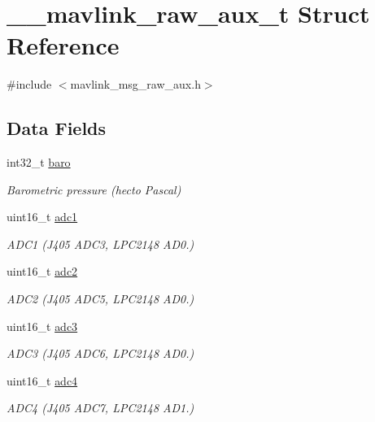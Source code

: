 \hypertarget{struct____mavlink__raw__aux__t}{\section{\+\_\+\+\_\+mavlink\+\_\+raw\+\_\+aux\+\_\+t Struct Reference}
\label{struct____mavlink__raw__aux__t}
}


{\ttfamily \#include $<$mavlink\+\_\+msg\+\_\+raw\+\_\+aux.\+h$>$}

\subsection*{Data Fields}
\begin{DoxyCompactItemize}
\item 
int32\+\_\+t \hyperlink{struct____mavlink__raw__aux__t_a5679ca5087f4ff5f9cc74757c1625328}{baro}
\begin{DoxyCompactList}\small\item\em Barometric pressure (hecto Pascal) \end{DoxyCompactList}\item 
uint16\+\_\+t \hyperlink{struct____mavlink__raw__aux__t_a3aef53e08ea480853c1bb5165c8ac52a}{adc1}
\begin{DoxyCompactList}\small\item\em A\+D\+C1 (J405 A\+D\+C3, L\+P\+C2148 A\+D0.) \end{DoxyCompactList}\item 
uint16\+\_\+t \hyperlink{struct____mavlink__raw__aux__t_a86a9158efd3095b7ce52e9f539c14624}{adc2}
\begin{DoxyCompactList}\small\item\em A\+D\+C2 (J405 A\+D\+C5, L\+P\+C2148 A\+D0.) \end{DoxyCompactList}\item 
uint16\+\_\+t \hyperlink{struct____mavlink__raw__aux__t_a971f20d82f42781dc19696eefd31b770}{adc3}
\begin{DoxyCompactList}\small\item\em A\+D\+C3 (J405 A\+D\+C6, L\+P\+C2148 A\+D0.) \end{DoxyCompactList}\item 
uint16\+\_\+t \hyperlink{struct____mavlink__raw__aux__t_aeb68737e2b5781df41e16ccd9d093eb6}{adc4}
\begin{DoxyCompactList}\small\item\em A\+D\+C4 (J405 A\+D\+C7, L\+P\+C2148 A\+D1.) \end{DoxyCompactList}\item 

\end{DoxyCompactItemize}
